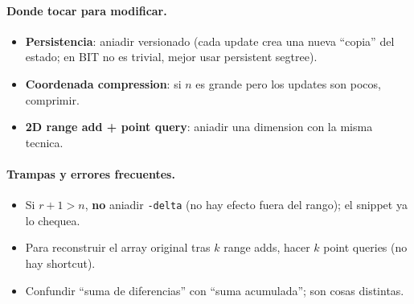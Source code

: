 \paragraph{Donde tocar para modificar.}
\begin{itemize}\setlength\itemsep{0pt}
	\item \textbf{Persistencia}: aniadir versionado (cada update crea una nueva ``copia'' del estado; en BIT no es trivial, mejor usar persistent segtree).
	\item \textbf{Coordenada compression}: si $n$ es grande pero los updates son pocos, comprimir.
	\item \textbf{2D range add + point query}: aniadir una dimension con la misma tecnica.
\end{itemize}

\paragraph{Trampas y errores frecuentes.}
\begin{itemize}\setlength\itemsep{0pt}
	\item Si $r+1 > n$, \textbf{no} aniadir \texttt{-delta} (no hay efecto fuera del rango); el snippet ya lo chequea.
	\item Para reconstruir el array original tras $k$ range adds, hacer $k$ point queries (no hay shortcut).
	\item Confundir ``suma de diferencias'' con ``suma acumulada''; son cosas distintas.
\end{itemize}

